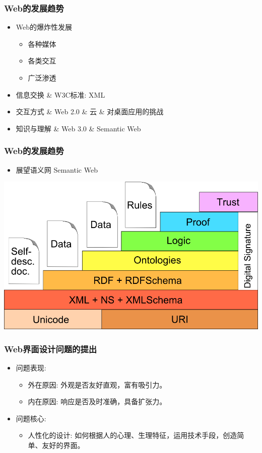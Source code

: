 \documentclass{beamer}
\begin{document}
\begin{frame}
	\frametitle{Web的发展趋势}
	\beamertemplatetransparentcovereddynamicmedium
	\begin{itemize}
		\item Web的爆炸性发展
		\begin{itemize}
			\item 各种媒体
			\item 各类交互
			\item 广泛渗透 
		\end{itemize}
		\pause
		\item 信息交换 \& W3C标准: XML
		\pause
		\item 交互方式 \& Web 2.0 \& 云 \& 对桌面应用的挑战
		\pause
		\item 知识与理解 \& Web 3.0 \& Semantic Web
	\end{itemize}
\end{frame}

\begin{frame}
	\frametitle{Web的发展趋势}
	\begin{itemize}
		\item 展望语义网 Semantic Web
	\end{itemize}
	\begin{center}
	\includegraphics[width=.8\textwidth]{images/semantic-web-stack.png}
	\end{center}
\end{frame}

\begin{frame}
	\frametitle{Web界面设计问题的提出}
	\beamertemplatetransparentcovereddynamicmedium
	\begin{itemize}
		\item 问题表现:
		\begin{itemize}
			\item 外在原因: 外观是否友好直观，富有吸引力。
			\item 内在原因: 响应是否及时准确，具备扩张力。
		\end{itemize}
		\pause
		\item 问题核心: 
		\begin{itemize}
			\item 人性化的设计: 如何根据人的心理、生理特征，运用技术手段，创造简单、友好的界面。
		\end{itemize}
	\end{itemize}
\end{frame}
\end{document}
